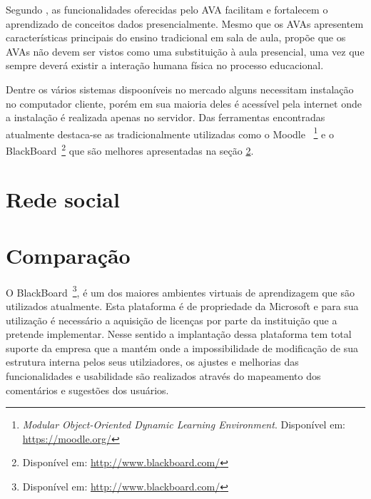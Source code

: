 Segundo , as funcionalidades oferecidas pelo AVA facilitam e fortalecem o aprendizado de conceitos dados presencialmente. Mesmo que os AVAs apresentem características principais do ensino tradicional em sala de aula,  propõe que os AVAs não devem ser vistos como uma substituição à aula presencial, uma vez que sempre deverá existir a interação humana física no processo educacional.

Dentre os vários sistemas dispooníveis no mercado alguns necessitam instalação no computador cliente, porém em sua maioria deles é acessível pela internet onde a instalação é realizada apenas no servidor. Das ferramentas encontradas atualmente destaca-se as tradicionalmente utilizadas como o Moodle ~\footnote{\textit{Modular Object-Oriented Dynamic Learning Environment}. Disponível em: \url{https://moodle.org/}} e o BlackBoard~\footnote{Disponível em: \url{http://www.blackboard.com/}} que são melhores apresentadas na seção \ref{comparacao-ava}.
%
%
%
\section{Rede social}
\label{rede-social}


\section{Comparação}
\label{comparacao-ava}

O BlackBoard~\footnote{Disponível em: \url{http://www.blackboard.com/}}, é um dos maiores ambientes virtuais de aprendizagem que são utilizados atualmente. Esta plataforma é de propriedade da Microsoft e para sua utilização é necessário a aquisição de licenças por parte da instituição que a pretende implementar. Nesse sentido a implantação dessa plataforma tem total suporte da empresa que a mantém onde a impossibilidade de modificação de sua estrutura interna pelos seus utilziadores, os ajustes e melhorias das funcionalidades e usabilidade são realizados através do mapeamento dos comentários e sugestões dos usuários.

